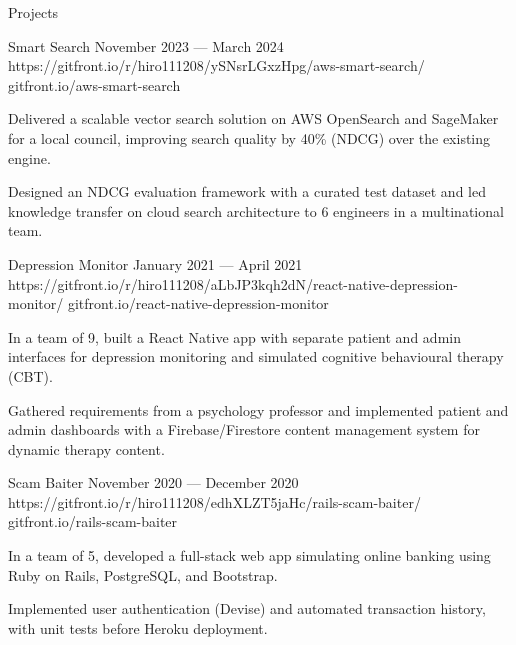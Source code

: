 \begin{rSection}{Projects}

    \begin{rProjectSubsection}
        {Smart Search}
        {November 2023 --- March 2024}
        {https://gitfront.io/r/hiro111208/ySNsrLGxzHpg/aws-smart-search/}
        {gitfront.io/aws-smart-search}
        {
            \item Delivered a scalable vector search solution on AWS OpenSearch and SageMaker for a local council, improving search quality by 40\% (NDCG) over the existing engine.
            \item Designed an NDCG evaluation framework with a curated test dataset and led knowledge transfer on cloud search architecture to 6 engineers in a multinational team.
        }
    \end{rProjectSubsection}

    \begin{rProjectSubsection}
        {Depression Monitor}
        {January 2021 --- April 2021}
        {https://gitfront.io/r/hiro111208/aLbJP3kqh2dN/react-native-depression-monitor/}
        {gitfront.io/react-native-depression-monitor}
        {
            \item In a team of 9, built a React Native app with separate patient and admin interfaces for depression monitoring and simulated cognitive behavioural therapy (CBT).
            \item Gathered requirements from a psychology professor and implemented patient and admin dashboards with a Firebase/Firestore content management system for dynamic therapy content.
        }
    \end{rProjectSubsection}

    \begin{rProjectSubsection}
        {Scam Baiter}
        {November 2020 --- December 2020}
        {https://gitfront.io/r/hiro111208/edhXLZT5jaHc/rails-scam-baiter/}
        {gitfront.io/rails-scam-baiter}
        {
            \item In a team of 5, developed a full-stack web app simulating online banking using Ruby on Rails, PostgreSQL, and Bootstrap.
            \item Implemented user authentication (Devise) and automated transaction history, with unit tests before Heroku deployment.
        }
    \end{rProjectSubsection}

\end{rSection}
